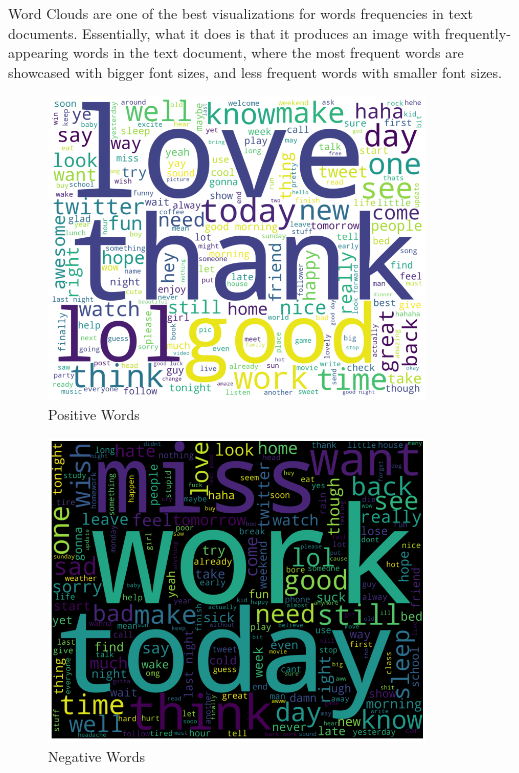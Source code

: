 \documentclass{article}
\begin{document}
Word Clouds are one of the best visualizations for words frequencies in text documents.
Essentially, what it does is that it produces an image with frequently-appearing words in the text document, where the most frequent words are showcased with bigger font sizes, and less frequent words with smaller font sizes.

\begin{figure}[h!]
    \centering
    \includegraphics[width=10cm]{positive.png}
    \caption{Positive Words}
    \label{fig:positive_words}
\end{figure}


\begin{figure}[h!]
    \centering
    \includegraphics[width=10cm]{negative.png}
    \caption{Negative Words}
    \label{fig:negative_words}
\end{figure}

\newpage
\end{document}
